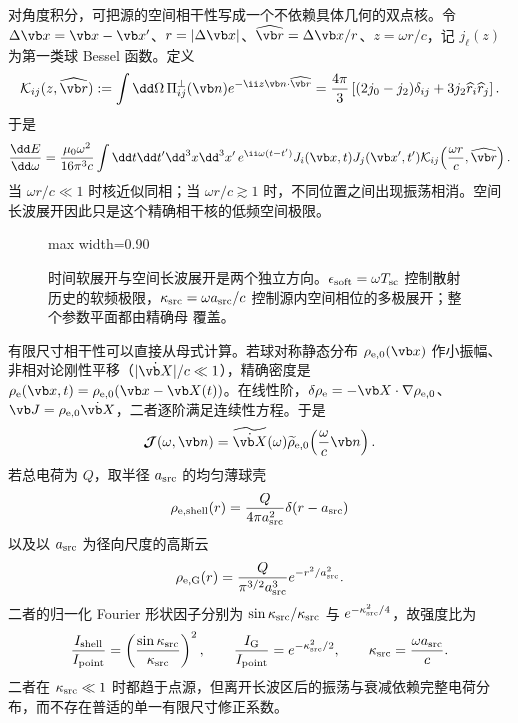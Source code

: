 对角度积分，可把源的空间相干性写成一个不依赖具体几何的双点核。令 \(\Delta\vb x=\vb x-\vb x'\)、\(r=|\Delta\vb x|\)、\(\widehat{\vb r}=\Delta\vb x/r\)、\(z=\omega r/c\)，记 \(j_\ell(z)\) 为第一类球 Bessel 函数。定义
\begin{equation}
 \mathcal K_{ij}(z,\widehat{\vb r})
 :=\int\dd\Omega\,\Pi^{\perp}_{ij}(\vb n)e^{-\ii z\vb n\cdot\widehat{\vb r}}
 =\frac{4\pi}{3}
 \left[(2j_0-j_2)\delta_{ij}+3j_2\widehat r_i\widehat r_j\right].
 \label{eq:phys-rr-transverse-coherence-kernel}
\end{equation}
于是
\begin{equation}
 \frac{\dd E}{\dd\omega}
 =\frac{\mu_0\omega^2}{16\pi^3c}
 \int\dd t\dd t'\dd^3x\dd^3x'\,
 e^{\ii\omega(t-t')}
 J_i(\vb x,t)J_j(\vb x',t')
 \mathcal K_{ij}\!\left(\frac{\omega r}{c},\widehat{\vb r}\right).
 \label{eq:phys-rr-exact-angle-integrated-current-spectrum}
\end{equation}
当 \(\omega r/c\ll1\) 时核近似同相；当 \(\omega r/c\gtrsim1\) 时，不同位置之间出现振荡相消。空间长波展开因此只是这个精确相干核的低频空间极限。

\begin{figure}[htbp]
\centering
\begin{adjustbox}{max width=0.90\linewidth}

\end{adjustbox}
\caption{时间软展开与空间长波展开是两个独立方向。\(\epsilon_{\rm soft}=\omega T_{\rm sc}\) 控制散射历史的软频极限，\(\kappa_{\rm src}=\omega a_{\rm src}/c\) 控制源内空间相位的多极展开；整个参数平面都由精确母 覆盖。}
\label{fig:phys-rr-frequency-regime-map}
\end{figure}

\begin{exbox}
有限尺寸相干性可以直接从母式计算。若球对称静态分布 \(\rho_{{\rm e},0}(\vb x)\) 作小振幅、非相对论刚性平移（\(|\dot{\vb X}|/c\ll1\)），精确密度是 \(\rho_{\rm e}(\vb x,t)=\rho_{{\rm e},0}(\vb x-\vb X(t))\)。在线性阶，\(\delta\rho_{\rm e}=-\vb X\cdot\nabla\rho_{{\rm e},0}\)、\(\vb J=\rho_{{\rm e},0}\dot{\vb X}\)，二者逐阶满足连续性方程。于是
\[
 \boldsymbol{\mathcal J}(\omega,\vb n)
 =\widetilde{\dot{\vb X}}(\omega)
 \widetilde\rho_{{\rm e},0}\!\left(\frac{\omega}{c}\vb n\right).
\]
若总电荷为 \(Q\)，取半径 \(a_{\rm src}\) 的均匀薄球壳
\[
 \rho_{{\rm e},{\rm shell}}(r)=\frac{Q}{4\pi a_{\rm src}^2}\delta(r-a_{\rm src})
\]
以及以 \(a_{\rm src}\) 为径向尺度的高斯云
\[
 \rho_{{\rm e},{\rm G}}(r)=\frac{Q}{\pi^{3/2}a_{\rm src}^3}e^{-r^2/a_{\rm src}^2}.
\]
二者的归一化 Fourier 形状因子分别为 \(\sin\kappa_{\rm src}/\kappa_{\rm src}\) 与 \(e^{-\kappa_{\rm src}^2/4}\)，故强度比为
\[
 \frac{I_{\rm shell}}{I_{\rm point}}
 =\left(\frac{\sin\kappa_{\rm src}}{\kappa_{\rm src}}\right)^2,
 \qquad
 \frac{I_{\rm G}}{I_{\rm point}}=e^{-\kappa_{\rm src}^2/2},
 \qquad \kappa_{\rm src}=\frac{\omega a_{\rm src}}{c}.
\]
二者在 \(\kappa_{\rm src}\ll1\) 时都趋于点源，但离开长波区后的振荡与衰减依赖完整电荷分布，而不存在普适的单一有限尺寸修正系数。
\end{exbox}

